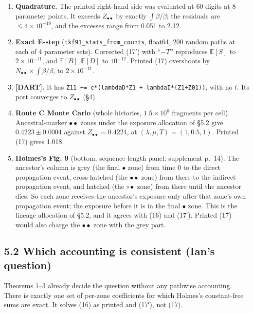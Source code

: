 \documentclass[10pt,]{article}
\providecommand{\tightlist}{%
  \setlength{\itemsep}{0pt}\setlength{\parskip}{0pt}}
\begin{document}
\begin{enumerate}
\def\labelenumi{\arabic{enumi}.}
\tightlist
\item
  \textbf{Quadrature.} The printed right-hand side was evaluated at 60
  digits at 8 parameter points. It exceeds \(Z_{\bullet\bullet}\) by
  exactly \(\int\beta/\beta\); the residuals are \(\le4\times10^{-18}\),
  and the excesses range from 0.051 to 2.12.
\item
  \textbf{Exact E-step} (\texttt{tkf91\_stats\_from\_counts}, float64,
  200 random paths at each of 4 parameter sets). Corrected (17′) with
  ``\(-T\)'' reproduces \(\mathbb E[S]\) to \(2\times10^{-11}\), and
  \(\mathbb E[B],\mathbb E[D]\) to \(10^{-12}\). Printed (17) overshoots
  by \(N_{\bullet\bullet}\times\int\beta/\beta\), to
  \(2\times10^{-11}\).
\item
  \textbf{{[}DART{]}.} It has
  \texttt{Z11\ +=\ c*(lambdaD*Z1\ +\ lambdaI*(Z1+Z01))}, with no \(t\).
  Its port converges to \(Z_{\bullet\bullet}\) (§4).
\item
  \textbf{Route C Monte Carlo} (whole histories, \(1.5\times10^6\)
  fragments per cell). Ancestral-marker \(\bullet\bullet\) zones under
  the exposure allocation of §5.2 give \(0.4223\pm0.0004\) against
  \(Z_{\bullet\bullet}=0.4224\), at \((\lambda,\mu,T)=(1,0.5,1)\).
  Printed (17) gives 1.018.
\item
  \textbf{Holmes's Fig. 9} (bottom, sequence-length panel; supplement
  p.~14). The ancestor's column is grey (the final \(\bullet\) zone)
  from time 0 to the direct propagation event, cross-hatched (the
  \(\bullet\bullet\) zone) from there to the indirect propagation event,
  and hatched (the \(\circ\bullet\) zone) from there until the ancestor
  dies. So each zone receives the ancestor's exposure only after that
  zone's own propagation event; the exposure before it is in the final
  \(\bullet\) zone. This is the lineage allocation of §5.2, and it
  agrees with (16) and (17′). Printed (17) would also charge the
  \(\bullet\bullet\) zone with the grey part.
\end{enumerate}

\hypertarget{which-accounting-is-consistent-ians-question}{%
\subsection{5.2 Which accounting is consistent (Ian's
question)}\label{which-accounting-is-consistent-ians-question}}

Theorems 1--3 already decide the question without any pathwise
accounting. There is exactly one set of per-zone coefficients for which
Holmes's constant-free sums are exact. It solves (16) as printed and
(17′), not (17).
\end{document}
